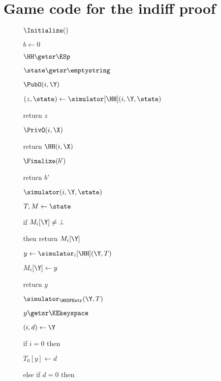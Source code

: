 \section*{Game code for the indiff proof}
\begin{figure}[tp]
	\begin{minipage}[t]{0.48\textwidth}
		\NewExperiment[Game $\Gm_0$]
		
		\begin{algorithm}{$\Initialize()$}
			\item $b \gets 0$
			\item $\HH \getsr \ESp$
			\item $\state \getsr \emptystring$
		\end{algorithm}
		\ExptSepSpace
		\begin{algorithm}{$\PubO(i,\Y)$}
			\item $(z,\state) \gets \simulator[\HH] (i,\Y,\state)$
			\item return $z$
		\end{algorithm}
		\ExptSepSpace
		\begin{algorithm}{$\PrivO(i,\X)$}
			\item return $\HH(i,\X)$
		\end{algorithm}	
		\ExptSepSpace
		\begin{algorithm}{$\Finalize(b')$}
			\item return $b'$
		\end{algorithm}
			\ExptSepSpace
			\begin{oracle}{$\simulator(i, \Y,\state)$}
				\item $T, M \gets \state$
				\item if $M_{i}[\Y] \neq \bot$
				\item \quad then return $M_{i}[\Y]$
				\item $y \gets \simulator_{i}[\HH](\Y, T)$
				\item $M_{i}[\Y] \gets y$
				\item return $y$
			\end{oracle}
		\ExptSepSpace
			\begin{oracle}{$\simulator_{\HKDFExtr}(\Y, T)$}
				\item $y \getsr \KEkeyspace$
				\item $(i, d) \gets \Y$
				\item if $i = 0$ then 
				\item \quad $T_{0}[y] \gets d$
				\item else if $d = 0$ then 

\end{oracle}
\end{minipage}
\end{figure}

